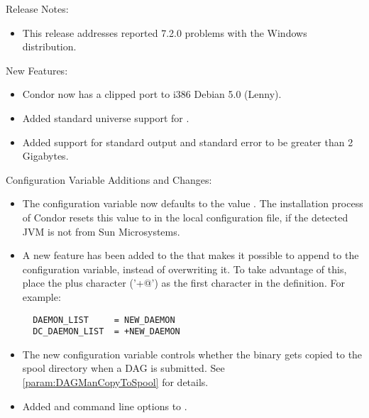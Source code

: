 \noindent Release Notes:

\begin{itemize}

\item This release addresses reported 7.2.0 problems with the
Windows distribution.

\end{itemize}


\noindent New Features:

\begin{itemize}

\item Condor now has a clipped port to i386 Debian 5.0 (Lenny).

\item Added standard universe support for .

\item Added support for standard output and standard error to be greater
than 2 Gigabytes.

\end{itemize}

\noindent Configuration Variable Additions and Changes:

\begin{itemize}

\item The configuration variable  now
defaults to the value .  The installation process of
Condor resets this value to  in the local
configuration file, if the detected JVM is not from Sun Microsystems.

\item A new feature has been added to the  that makes
it possible to append to the  configuration
variable, instead of overwriting it.  To take advantage of this, place
the plus character ('\verb@+@') as the first character in the
 definition.  For example:
\begin{verbatim}
  DAEMON_LIST     = NEW_DAEMON
  DC_DAEMON_LIST  = +NEW_DAEMON
\end{verbatim}

\item The new configuration variable 
controls whether the  binary gets copied to the spool
directory when a DAG is submitted.  See \ref{param:DAGManCopyToSpool}
for details.

\item Added  and  command line options to
.

\end{itemize}

